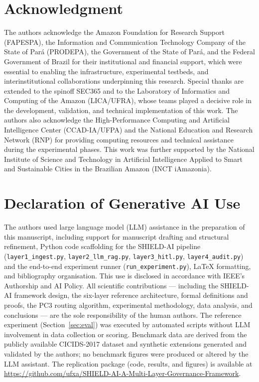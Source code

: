 \documentclass[journal]{IEEEtran}
\begin{document}
\section*{Acknowledgment}
The authors acknowledge the Amazon Foundation for Research Support (FAPESPA), the
Information and Communication Technology Company of the State of Pará (PRODEPA), the
Government of the State of Pará, and the Federal Government of Brazil for their
institutional and financial support, which were essential to enabling the infrastructure,
experimental testbeds, and interinstitutional collaborations underpinning this research.
Special thanks are extended to the spinoff SEC365 and to the Laboratory of
Informatics and Computing of the Amazon (LICA/UFRA), whose teams played a decisive role
in the development, validation, and technical implementation of this work.
The authors also acknowledge the High-Performance Computing and Artificial Intelligence
Center (CCAD-IA/UFPA) and the National Education and Research Network (RNP) for
providing computing resources and technical assistance during the experimental phases.
This work was further supported by the National Institute of Science and Technology in
Artificial Intelligence Applied to Smart and Sustainable Cities in the Brazilian Amazon
(INCT iAmazonia).

\section*{Declaration of Generative AI Use}
The authors used large language model (LLM) assistance in the preparation of this
manuscript, including support for manuscript drafting and structural refinement,
Python code scaffolding for the SHIELD-AI pipeline
(\texttt{layer1\_ingest.py}, \texttt{layer2\_llm\_rag.py}, \texttt{layer3\_hitl.py},
\texttt{layer4\_audit.py}) and the end-to-end experiment runner
(\texttt{run\_experiment.py}), \LaTeX{} formatting, and bibliography organisation.
This use is disclosed in accordance with IEEE's Authorship and AI Policy.
All scientific contributions --- including the SHIELD-AI framework design, the
six-layer reference architecture, formal definitions and proofs, the PC3 routing
algorithm, experimental methodology, data analysis, and conclusions --- are the sole
responsibility of the human authors.
The reference experiment (Section~\ref{sec:eval}) was executed by automated scripts
without LLM involvement in data collection or scoring.
Benchmark data are derived from the publicly available CICIDS-2017 dataset and
synthetic extensions generated and validated by the authors; no benchmark figures
were produced or altered by the LLM assistant.
The replication package (code, results, and figures) is available at
\url{https://github.com/ufxa/SHIELD-AI-A-Multi-Layer-Governance-Framework}.



\end{document}
